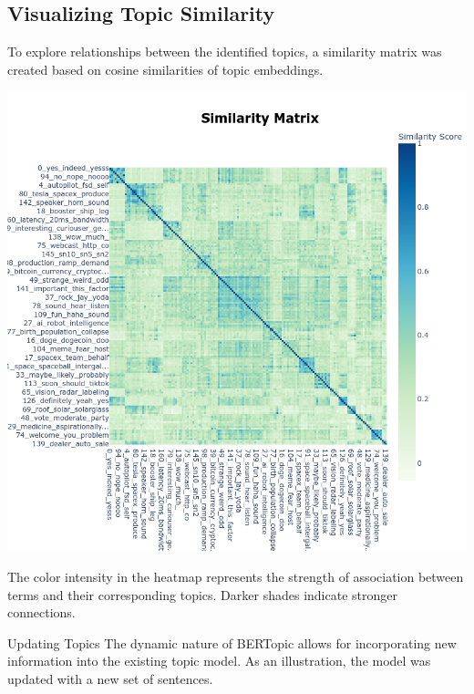 \documentclass[12pt]{article}
\begin{document}
\subsection{Visualizing Topic Similarity}
To explore relationships between the identified topics, a similarity matrix was created based on cosine similarities of topic embeddings.
\begin{minipage}{0.48\textwidth}
    \centering
    \includegraphics[width=\linewidth]{heatmap.png}
        \label{fig:simmatrix}
    \end{minipage}\hfill
The color intensity in the heatmap represents the strength of association between terms and their corresponding topics. Darker shades indicate stronger connections.

Updating Topics
The dynamic nature of BERTopic allows for incorporating new information into the existing topic model. As an illustration, the model was updated with a new set of sentences.
\end{document}
